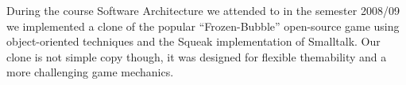During the course Software Architecture we 
attended to in the semester 2008/09 we 
implemented a clone of the popular ``Frozen-Bubble''
open-source game using object-oriented techniques 
and the Squeak implementation of Smalltalk.
Our clone is not simple copy though, it was 
designed for flexible themability and
a more challenging game mechanics.

